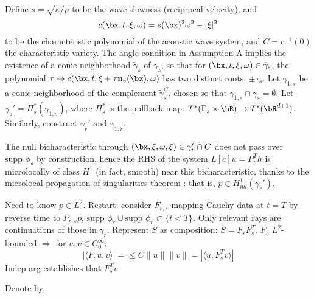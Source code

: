 Define $s=\sqrt{\kappa/\rho}$ to be the wave slowness (reciprocal velocity), and
\[
c(\bx,t,\xi,\omega) = s(\bx)^2\omega^2-|\xi|^2
\]
to be the characteristic polynomial of the acoustic wave system, and $C=c^{-1}(0)$ the characteristic variety.  The angle condition in Assumption A implies the existence of a conic neighborhood $\tilde{\gamma}_s$ of $\gamma_s$, so that for  $(\bx,t,\xi,\omega) \in \tilde{\gamma}_s$, the polynomial $\tau \mapsto c(\bx,t,\xi + \tau{\bf n}_s(\bx),\omega)$ has two distinct roots, $\pm \tau_s$. Let $\gamma_{1,s}$ be a conic neighborhood of the complement $\tilde{\gamma}_s^C$, chosen so that $\gamma_{1,s} \cap \gamma_s = \emptyset$. Let $\gamma_s' = \Pi_s^*(\gamma_{1,s})$, where $\Pi_s^*$ is the pullback map: $T^*(\Gamma_s\times \bR) \rightarrow T^*(\bR^{d+1})$. Similarly, construct $\gamma_r'$ and $\gamma_{1,r}$. 

The null bicharacteristic through $(\bx,\xi,\omega,\xi) \in \gamma_r' \cap C$ does not pass over $\mbox{supp } \phi_s$ by construction, hence the RHS of the system $L[c]u=P_r^Th$ is microlocally of class $H^1$ (in fact, smooth) near this bicharacteristic,  thanks to the microlocal propagation of singularities theorem \cite[]{BealsReed:82}: that is, $p \in H^1_{ml}(\gamma_r')$. 

Need to know $p \in L^2$. Restart: consider $F_{r,s}$ mapping Cauchy data at $t=T$ by reverse time to $P_{r,s} p$, $\mbox{supp }\phi_s \cup \mbox{supp }\phi_r \subset \{t<T\}$. Only relevant rays are continuations of those in $\gamma_r$. Represent $S$ as composition: $S=F_rF_s^T$. $F_s$ $L^2$-bounded $\Rightarrow$ for $u, v \in C_0^{\infty}$,
\[
|\langle F_s u, v \rangle| = \le C\|u\|\|v\|=|\langle u, F_s^T v\rangle|
\]
Indep arg establishes that $F_s^Tv$




Denote by 



